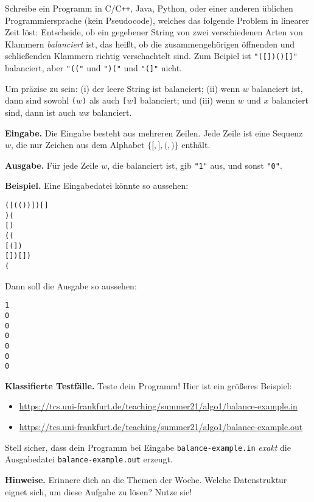\documentclass{uebung_cs}
\begin{document}
Schreibe ein Programm in C/C\verb|++|, Java, Python, oder einer anderen üblichen Programmiersprache (kein Pseudocode), welches das folgende Problem in linearer Zeit löst:
Entscheide, ob ein gegebener String von zwei verschiedenen Arten von Klammern \emph{balanciert} ist, das heißt, ob die zusammengehörigen öffnenden und schließenden Klammern richtig verschachtelt sind. Zum Beipiel ist \texttt{"([])()[]"} balanciert, aber \texttt{"(("} und \texttt{")("} und \texttt{"(]"} nicht.

Um präzise zu sein: (i) der leere String ist balanciert; (ii) wenn $w$ balanciert ist, dann sind sowohl \texttt{(}$w$\texttt{)} als auch \texttt{[}$w$\texttt{]} balanciert; und (iii) wenn $w$ und $x$ balanciert sind, dann ist auch $wx$ balanciert.

\textbf{Eingabe.}
Die Eingabe besteht aus mehreren Zeilen. Jede Zeile ist eine Sequenz $w$, die nur Zeichen aus dem Alphabet $\{\texttt{[},\texttt{]},\texttt{(},\texttt{)}\}$ enthält.

\textbf{Ausgabe.}
Für jede Zeile $w$, die balanciert ist, gib \texttt{"1"} aus, und sonst \texttt{"0"}.

\textbf{Beispiel.}
Eine Eingabedatei könnte so aussehen:
\begin{verbatim}
([(())])[]
)(
[)
((
[(])
[])[])
(
\end{verbatim}
Dann soll die Ausgabe so aussehen:
\begin{verbatim}
1
0
0
0
0
0
0
\end{verbatim}

\textbf{Klassifierte Testfälle.}
Teste dein Programm! Hier ist ein größeres Beispiel:
\begin{itemize}[noitemsep]
\item \url{https://tcs.uni-frankfurt.de/teaching/summer21/algo1/balance-example.in}
\item \url{https://tcs.uni-frankfurt.de/teaching/summer21/algo1/balance-example.out}
\end{itemize}
Stell sicher, dass dein Programm bei Eingabe \texttt{balance-example.in} \emph{exakt} die Ausgabedatei \texttt{balance-example.out} erzeugt.

\textbf{Hinweise.}
Erinnere dich an die Themen der Woche. Welche Datenstruktur eignet sich, um diese Aufgabe zu lösen? Nutze sie!
\end{document}
